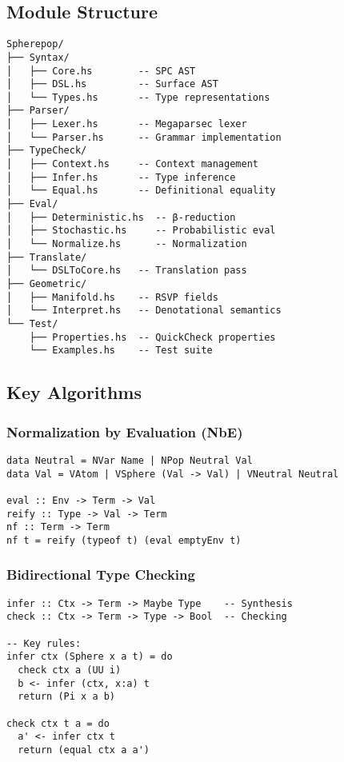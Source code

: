 \documentclass[12pt]{article}
\theoremstyle{definition}
\begin{document}
\subsection{Module Structure}
\begin{verbatim}
Spherepop/
├── Syntax/
│   ├── Core.hs        -- SPC AST
│   ├── DSL.hs         -- Surface AST
│   └── Types.hs       -- Type representations
├── Parser/
│   ├── Lexer.hs       -- Megaparsec lexer
│   └── Parser.hs      -- Grammar implementation
├── TypeCheck/
│   ├── Context.hs     -- Context management
│   ├── Infer.hs       -- Type inference
│   └── Equal.hs       -- Definitional equality
├── Eval/
│   ├── Deterministic.hs  -- β-reduction
│   ├── Stochastic.hs     -- Probabilistic eval
│   └── Normalize.hs      -- Normalization
├── Translate/
│   └── DSLToCore.hs   -- Translation pass
├── Geometric/
│   ├── Manifold.hs    -- RSVP fields
│   └── Interpret.hs   -- Denotational semantics
└── Test/
    ├── Properties.hs  -- QuickCheck properties
    └── Examples.hs    -- Test suite
\end{verbatim}

\subsection{Key Algorithms}
\subsubsection{Normalization by Evaluation (NbE)}
\begin{verbatim}
data Neutral = NVar Name | NPop Neutral Val
data Val = VAtom | VSphere (Val -> Val) | VNeutral Neutral

eval :: Env -> Term -> Val
reify :: Type -> Val -> Term
nf :: Term -> Term
nf t = reify (typeof t) (eval emptyEnv t)
\end{verbatim}

\subsubsection{Bidirectional Type Checking}
\begin{verbatim}
infer :: Ctx -> Term -> Maybe Type    -- Synthesis
check :: Ctx -> Term -> Type -> Bool  -- Checking

-- Key rules:
infer ctx (Sphere x a t) = do
  check ctx a (UU i)
  b <- infer (ctx, x:a) t
  return (Pi x a b)

check ctx t a = do
  a' <- infer ctx t
  return (equal ctx a a')
\end{verbatim}
\end{document}
